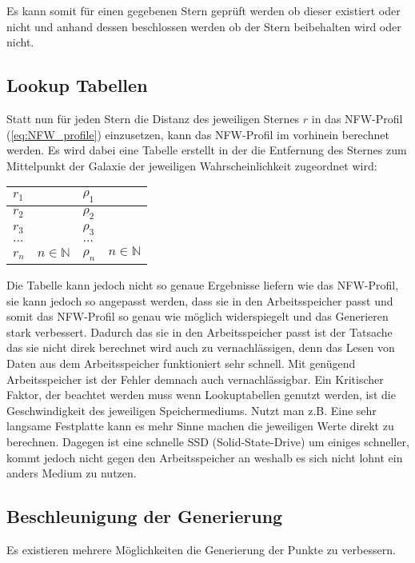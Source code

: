 Es kann somit für einen gegebenen Stern geprüft werden ob dieser existiert oder
nicht und anhand dessen beschlossen werden ob der Stern beibehalten wird oder
nicht.

\subsection{Lookup Tabellen}
Statt nun für jeden Stern die Distanz des jeweiligen Sternes \( r \) in das
NFW-Profil (\ref{eq:NFW_profile}) einzusetzen, kann das NFW-Profil im vorhinein
berechnet werden. Es wird dabei eine Tabelle erstellt in der die Entfernung des
Sternes zum Mittelpunkt der Galaxie der jeweiligen Wahrscheinlichkeit
zugeordnet wird:

\begin{center}
\begin{tabular} {l | l}
    \( r_1 \) & \( \rho_1 \) \\ \hline
    \( r_2 \) & \( \rho_2 \) \\ \hline
    \( r_3 \) & \( \rho_3 \) \\ \hline
    \( \dots \) & \( \dots \) \\ \hline
    \( r_n \quad n \in \mathbb{N} \) & \( \rho_n \quad n \in \mathbb{N} \) \\ \hline
\end{tabular}
\end{center}

Die Tabelle kann jedoch nicht so genaue Ergebnisse liefern wie das NFW-Profil,
sie kann jedoch so angepasst werden, dass sie in den Arbeitsspeicher passt und
somit das NFW-Profil so genau wie möglich widerspiegelt und das Generieren
stark verbessert. Dadurch das sie in den Arbeitsspeicher passt ist der Tatsache
das sie nicht direk berechnet wird auch zu vernachlässigen, denn das Lesen von
Daten aus dem Arbeitsspeicher funktioniert sehr schnell. Mit genügend
Arbeitsspeicher ist der Fehler demnach auch vernachlässigbar. Ein Kritischer
Faktor, der beachtet werden muss wenn Lookuptabellen genutzt werden, ist die
Geschwindigkeit des jeweiligen Speichermediums. Nutzt man z.B. Eine sehr
langsame Festplatte kann es mehr Sinne machen die jeweiligen Werte direkt zu
berechnen. Dagegen ist eine schnelle SSD (Solid-State-Drive) um einiges
schneller, kommt jedoch nicht gegen den Arbeitsspeicher an weshalb es sich
nicht lohnt ein anders Medium zu nutzen.

\subsection{Beschleunigung der Generierung}
Es existieren mehrere Möglichkeiten die Generierung der Punkte zu verbessern.

